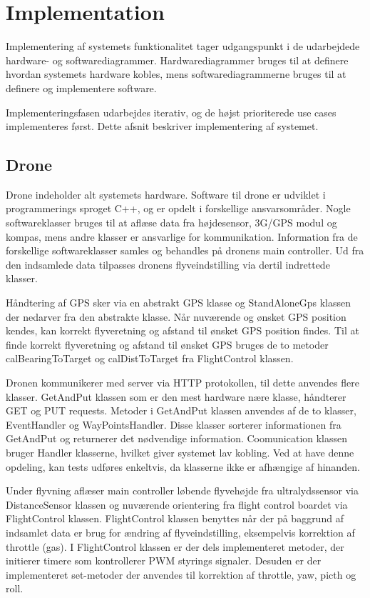 \section{Implementation}
Implementering af systemets funktionalitet tager udgangspunkt i de udarbejdede hardware- og softwarediagrammer. Hardwarediagrammer bruges til at definere hvordan systemets hardware kobles, mens softwarediagrammerne bruges til at definere og implementere software.

Implementeringsfasen udarbejdes iterativ, og de højst prioriterede use cases implementeres først. 
Dette afsnit beskriver implementering af systemet.


\subsection{Drone}
Drone indeholder alt systemets hardware. Software til drone er udviklet i programmerings sproget C++, og er opdelt i forskellige ansvarsområder. Nogle softwareklasser bruges til at aflæse data fra højdesensor, 3G/GPS modul og kompas, mens andre klasser er ansvarlige for kommunikation. Information fra de forskellige softwareklasser samles og behandles på dronens main controller. Ud fra den indsamlede data tilpasses dronens flyveindstilling via dertil indrettede klasser. 

Håndtering af GPS sker via en abstrakt GPS klasse og StandAloneGps klassen der nedarver fra den abstrakte klasse. Når nuværende og ønsket GPS position kendes, kan korrekt flyveretning og afstand til ønsket GPS position findes. Til at finde korrekt flyveretning og afstand til ønsket GPS bruges de to metoder calBearingToTarget og calDistToTarget fra FlightControl klassen. 

Dronen kommunikerer med server via HTTP protokollen, til dette anvendes flere klasser. GetAndPut klassen som er den mest hardware nære klasse, håndterer GET og PUT requests. Metoder i GetAndPut klassen anvendes af de to klasser, EventHandler og WayPointsHandler. Disse klasser sorterer informationen fra GetAndPut og returnerer det nødvendige information. Coomunication klassen bruger Handler klasserne, hvilket giver systemet lav kobling. Ved at have denne opdeling, kan tests udføres enkeltvis, da klasserne ikke er afhængige af hinanden.

Under flyvning aflæser main controller løbende flyvehøjde fra ultralydssensor via DistanceSensor klassen og nuværende orientering fra flight control boardet via FlightControl klassen. FlightControl klassen benyttes når der på baggrund af indsamlet data er brug for ændring af flyveindstilling, eksempelvis korrektion af throttle (gas). I FlightControl klassen er der dels implementeret metoder, der initierer timere som kontrollerer PWM styrings signaler. Desuden er der implementeret set-metoder der anvendes til korrektion af throttle, yaw, picth og roll.  

